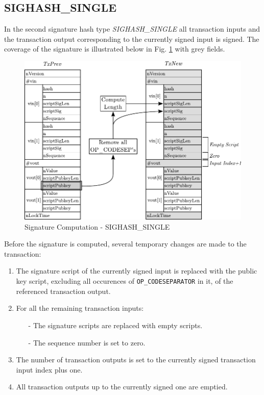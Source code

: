 \clearpage
\subsection*{SIGHASH\_SINGLE}
In the second signature hash type \emph{SIGHASH\_SINGLE} all transaction inputs and the transaction output corresponding to the currently signed input is signed. The coverage of the signature is illustrated below in Fig. \ref{fig:SigHash-Single} with grey fields.

\begin{figure}[ht!]
 \centering
 \includegraphics[scale=0.975]{Images/SIGHASH_SINGLE.pdf}
 \caption{Signature Computation - SIGHASH\_SINGLE} \label{fig:SigHash-Single}
\end{figure}

\noindent
Before the signature is computed, several temporary changes are made to the transaction:
\begin{enumerate}[label=\alph*), leftmargin=1cm]
\item The signature script of the currently signed input is replaced with the public key script, excluding all occurences of \texttt{OP\_CODESEPARATOR} in it, of the referenced transaction output.
\item For all the remaining transaction inputs:\vspace{5pt}
\begin{itemize}
\item[-] The signature scripts are replaced with empty scripts.
\item[-] The sequence number is set to zero.
\end{itemize}
\item The number of transaction outputs is set to the currently signed transaction input index plus one.
\item All transaction outputs up to the currently signed one are emptied.
\end{enumerate}


